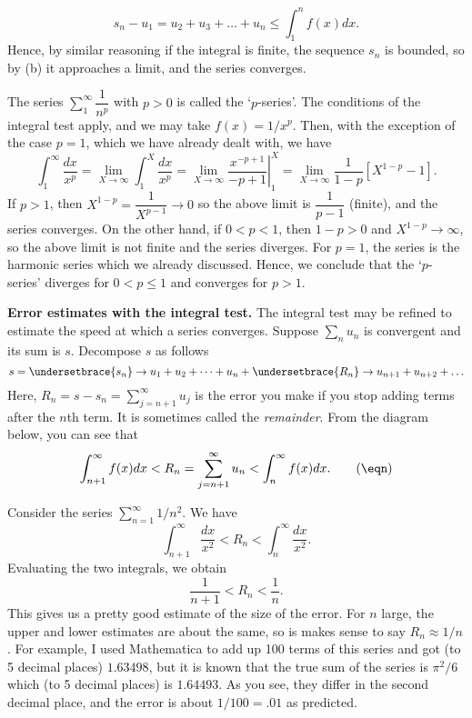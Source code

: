 $$ s_n - u_1 = u_2 + u_3 + \dots + u_n \le \int_1^n f(x)dx.
$$
Hence, by similar reasoning if the integral is finite, the
sequence $s_n$ is bounded, so by (b) it approaches a limit,
and the series converges.

\nextex
{}  The series $\sum_1^\infty \dfrac 1{n^p}$
with $p > 0$
is called the `$p$-series'.  The conditions of the integral
test apply, and we may take $f(x) = 1/x^p$.  Then, with the
exception of the case $p = 1$, which we have already dealt with,
we have
$$
\int_1^\infty \frac{dx}{x^p} =
\lim_{X\to \infty}\int_1^X\frac{dx}{x^p} =
\lim_{X\to \infty}\left.\frac{x^{-p+1}}{-p + 1}\right|_1^X
 = \lim_{X\to \infty}\frac 1{1-p}[ X^{1 - p} -1].
$$
If $p > 1$, then $X^{1-p} = \dfrac 1{X^{p-1}} \to 0$
so the above limit is $\dfrac 1{p-1}$ (finite), and the
series converges.
On the other hand, if $0 < p < 1$, then $1 - p > 0$ and
$X^{1-p} \to \infty$, so the above limit is not finite and the
series diverges.
For $p = 1$, the series is the harmonic series which we already
discussed.
Hence, we conclude that the `$p$-series' diverges for
$0 < p \le 1$ and converges for $p > 1$.  
\endexample

{\bf Error estimates with the integral test.}
The integral test may be refined to estimate the speed at
which a series converges.   Suppose $\sum_n u_n$ is
%
%
convergent and its sum is $s$.   
Decompose $s$ as follows
$$
s = \undersetbrace{s_n}\to{u_1 + u_2 + \dots + u_n}
 + \undersetbrace{R_n}\to{u_{n+1} + u_{n+2} + \dots }
$$
Here, $R_n = s - s_n = \sum_{j = n+1}^\infty u_j$ is the
error you make if you stop adding terms after the $n$th term.
It is sometimes called the {\it remainder}.  From the diagram
below, you can see that
\nexteqn
$$
\int_{n+1}^\infty f(x)dx < R_n = \sum_{j=n+1}^\infty u_n < \int_n^\infty
f(x)dx.\tag\eqn
$$ 
\medskip
\centerline{}
\medskip

\nextex
{}  Consider the series $\sum_{n=1}^\infty 1/n^2$.
We have
$$
\int_{n+1}^\infty \frac{dx}{x^2} < R_n < \int_n^\infty \frac{dx}{x^2}.
$$
Evaluating the two integrals, we obtain
$$
\frac 1{n+1} < R_n < \frac 1n.
$$
This gives us a pretty good estimate of the size of the error.  For
$n$ large, the upper and lower estimates are about the same, so
is makes sense to say $R_n \approx 1/n$.  For example, I used
Mathematica to add up 100 terms of this series and got
(to 5  decimal places) $1.63498$, but it is known that the true
sum of the series is $\pi^2/6$ which (to 5 decimal places) is $1.64493$.  As
you see, they differ in the second decimal place, and the error
is about $1/100 = .01$ as predicted.  


